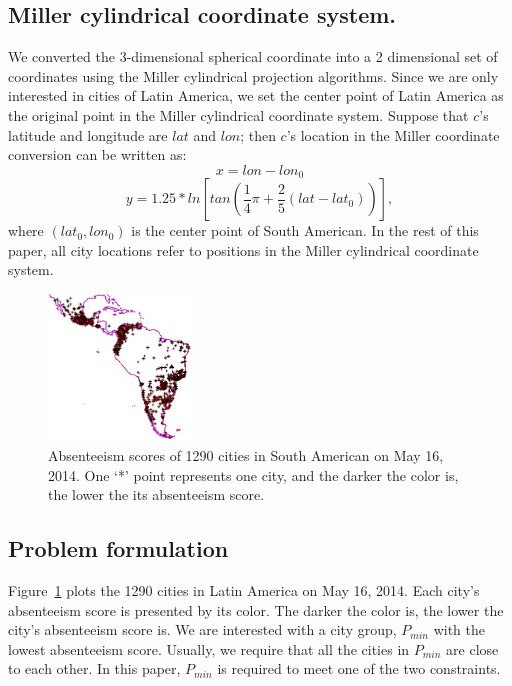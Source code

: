 \subsection{Miller cylindrical coordinate system.}
We converted the 3-dimensional spherical coordinate into a 2 dimensional
set of coordinates using the Miller cylindrical projection algorithms. %
Since we are only interested in cities of Latin America, we set the center point of Latin
America as the original point in the Miller cylindrical coordinate system. Suppose that $c$'s latitude and longitude are $lat$ and $lon$; then $c$'s location in the Miller coordinate conversion can be written as:
\begin{equation}
x = lon - lon_0
\end{equation}
\vspace{-5mm}
\begin{equation}
y = 1.25*ln[tan(\frac{1}{4}\pi+\frac{2}{5}(lat-lat_0))],
\end{equation}
where $(lat_0,lon_0)$ is the center point of South American.
In the rest of
this paper, all city locations refer to positions in the Miller cylindrical coordinate system.
\begin{figure}[t]
	\centering
	\includegraphics[width=1.5in]{figures/zscore.png}
	\caption{Absenteeism scores of 1290 cities in South American on May 16, 2014. One `*' point represents one city, and the darker the color is, the lower the its absenteeism score.}
	\label{fig:city_south_american}
\end{figure}


\subsection{Problem formulation}
 Figure~\ref{fig:city_south_american} plots the 1290 cities in Latin America
on May 16, 2014. Each city's absenteeism score is presented by its color. The darker the color is, the lower the city's absenteeism score is. We are interested with a city group, $P_{min}$ with the lowest absenteeism score. Usually, we require that all the cities in $P_{min}$ are close to each other. In this paper,  $P_{min}$ is required to meet one of the two constraints.

